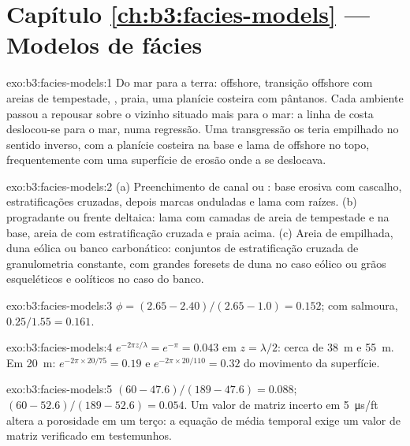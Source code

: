 \section*{Capítulo \ref{ch:b3:facies-models} --- Modelos de fácies}

\begin{solution}{exo:b3:facies-models:1}
Do mar para a terra: offshore, transição offshore com areias de tempestade,
, praia, uma planície costeira com pântanos. Cada ambiente passou a repousar
sobre o vizinho situado mais para o mar: a linha de costa deslocou-se para o mar, numa regressão. Uma
transgressão os teria empilhado no sentido inverso, com a planície costeira na
base e lama de offshore no topo, frequentemente com uma superfície de erosão onde a
 se deslocava.
\end{solution}

\begin{solution}{exo:b3:facies-models:2}
(a) Preenchimento de canal ou : base erosiva com cascalho, estratificações cruzadas,
depois marcas onduladas e lama com raízes. (b)  progradante ou frente deltaica:
lama com camadas de areia de tempestade e  na base,
areia de  com estratificação cruzada e praia acima. (c) Areia de  empilhada,
duna eólica ou banco carbonático: conjuntos de estratificação cruzada de granulometria
constante, com grandes foresets de duna no caso eólico ou grãos esqueléticos e oolíticos
no caso do banco.
\end{solution}

\begin{solution}{exo:b3:facies-models:3}
$\phi = (2.65 - 2.40)/(2.65 - 1.0) = 0.152$; com salmoura,
$0.25/1.55 = 0.161$.
\end{solution}

\begin{solution}{exo:b3:facies-models:4}
$e^{-2\pi z/\lambda} = e^{-\pi} = 0.043$ em $z = \lambda/2$: cerca de
\qty{38}{m} e \qty{55}{m}. Em \qty{20}{m}: $e^{-2\pi\times20/75} = 0.19$
e $e^{-2\pi\times20/110} = 0.32$ do movimento da superfície.
\end{solution}

\begin{solution}{exo:b3:facies-models:5}
$(60 - 47.6)/(189 - 47.6) = 0.088$; $(60 - 52.6)/(189 - 52.6) = 0.054$. Um
valor de matriz incerto em \qty{5}{\micro\second/ft} altera a porosidade em
um terço: a equação de média temporal exige um valor de matriz verificado em testemunhos.
\end{solution}


